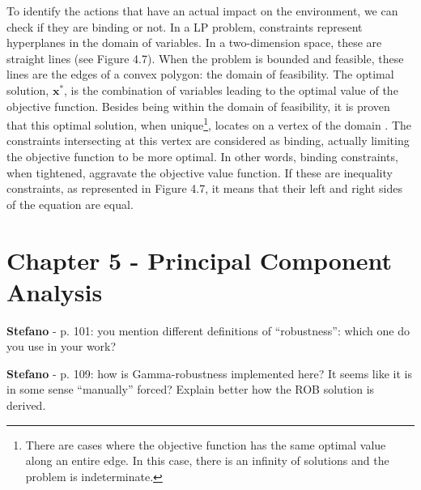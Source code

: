 \documentclass[12pt,a4paper]{article}
\begin{document}
\begin{mdframed}[style=manuscript] %
To identify the actions that have an actual impact on the environment, we can check if they are binding or not. In a LP problem, constraints represent hyperplanes in the domain of variables. In a two-dimension space, these are straight lines (see Figure 4.7). When the problem is bounded and feasible, these lines are the edges of a convex polygon: the domain of feasibility. The optimal solution, $\textbf{x}^*$, is the combination of variables leading to the optimal value of the objective function. Besides being within the domain of feasibility, it is proven that this optimal solution, when unique\footnote{There are cases where the objective function has the same optimal value along an entire edge. In this case, there is an infinity of solutions and the problem is indeterminate.}, locates on a vertex of the domain \cite{bertsimas1997introduction}. The constraints intersecting at this vertex are considered as binding, actually limiting the objective function to be more optimal. In other words, binding constraints, when tightened, aggravate the objective value function. If these are inequality constraints, as represented in Figure 4.7, it means that their left and right sides of the equation are equal.
\end{mdframed}

\section{Chapter 5 - Principal Component Analysis}
\label{PCA}

\begin{mdframed}[style=comment] %
{\color{orange} \textbf{Stefano}} - p. 101: you mention different definitions of “robustness”: which one do you use in your work?
\end{mdframed}

\noindent 

\begin{mdframed}[style=manuscript] %

\end{mdframed}

\begin{mdframed}[style=comment] %
{\color{orange} \textbf{Stefano}} - p. 109: how is Gamma-robustness implemented here? It seems like it is in some sense “manually” forced? Explain better how the ROB solution is derived.
\end{mdframed}
\end{document}

